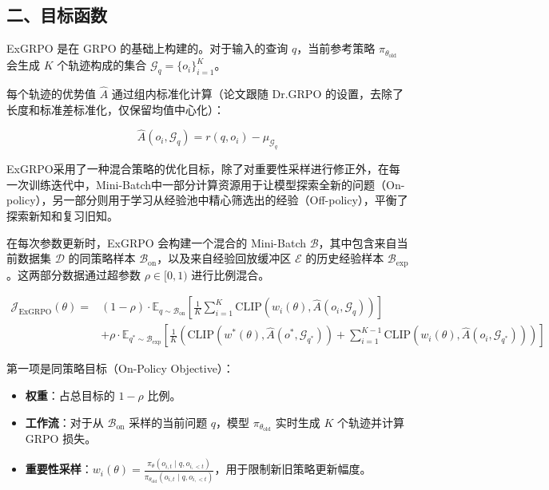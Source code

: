 \hypertarget{ux4e8cux76eeux6807ux51fdux6570-1}{%
\subsection{二、目标函数}\label{ux4e8cux76eeux6807ux51fdux6570-1}}

ExGRPO 是在 GRPO 的基础上构建的。对于输入的查询 \(q\)，当前参考策略 \(\pi_{\theta_{\mathrm{old}}}\) 会生成 \(K\) 个轨迹构成的集合 \(\mathcal{G}_q=\{o_i\}_{i=1}^{K}\)。

每个轨迹的优势值 \(\hat{A}\) 通过组内标准化计算（论文跟随 Dr.GRPO 的设置，去除了长度和标准差标准化，仅保留均值中心化）：

\[
\hat{A}(o_i,\mathcal{G}_q)=r(q,o_i)-\mu_{\mathcal{G}_q}
\]

ExGRPO采用了一种混合策略的优化目标，除了对重要性采样进行修正外，在每一次训练迭代中，Mini-Batch中一部分计算资源用于让模型探索全新的问题（On-policy），另一部分则用于学习从经验池中精心筛选出的经验（Off-policy），平衡了探索新知和复习旧知。

在每次参数更新时，ExGRPO 会构建一个混合的 Mini-Batch \(\mathcal{B}\)，其中包含来自当前数据集 \(\mathcal{D}\) 的同策略样本 \(\mathcal{B}_{\mathrm{on}}\)，以及来自经验回放缓冲区 \(\mathcal{E}\) 的历史经验样本 \(\mathcal{B}_{\mathrm{exp}}\)。这两部分数据通过超参数 \(\rho\in[0,1)\) 进行比例混合。

\[
\begin{aligned}
\mathcal{J}_{\mathrm{ExGRPO}}(\theta)
=&(1-\rho)\cdot
\mathbb{E}_{q\sim\mathcal{B}_{\mathrm{on}}}
\left[
\frac{1}{K}\sum_{i=1}^{K}
\mathrm{CLIP}\left(w_i(\theta),\hat{A}(o_i,\mathcal{G}_q)\right)
\right] \\
&+\rho\cdot
\mathbb{E}_{q^*\sim\mathcal{B}_{\mathrm{exp}}}
\left[
\frac{1}{K}
\left(
\mathrm{CLIP}\left(w^*(\theta),\hat{A}(o^*,\mathcal{G}_{q^*})\right)
+\sum_{i=1}^{K-1}
\mathrm{CLIP}\left(w_i(\theta),\hat{A}(o_i,\mathcal{G}_{q^*})\right)
\right)
\right]
\end{aligned}
\]

第一项是同策略目标（On-Policy Objective）：

\begin{itemize}
\tightlist
\item
  \textbf{权重}：占总目标的 \(1-\rho\) 比例。
\item
  \textbf{工作流}：对于从 \(\mathcal{B}_{\mathrm{on}}\) 采样的当前问题 \(q\)，模型 \(\pi_{\theta_{\mathrm{old}}}\) 实时生成 \(K\) 个轨迹并计算 GRPO 损失。
\item
  \textbf{重要性采样}：\(w_i(\theta)=\frac{\pi_\theta(o_{i,t}\mid q,o_{i,<t})}{\pi_{\theta_{\mathrm{old}}}(o_{i,t}\mid q,o_{i,<t})}\)，用于限制新旧策略更新幅度。
\end{itemize}

